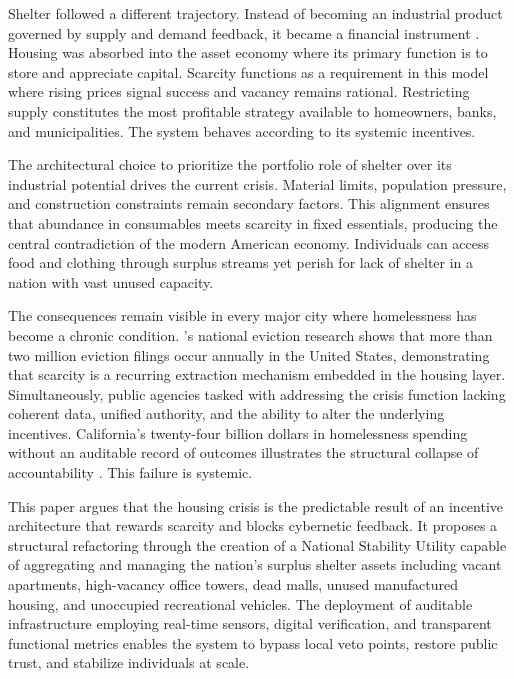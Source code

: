 \documentclass[12pt, letterpaper]{article}
\begin{document}
Shelter followed a different trajectory. Instead of becoming an industrial product governed by supply and demand feedback, it became a financial instrument \citep{aalbers_2016}. Housing was absorbed into the asset economy where its primary function is to store and appreciate capital. Scarcity functions as a requirement in this model where rising prices signal success and vacancy remains rational. Restricting supply constitutes the most profitable strategy available to homeowners, banks, and municipalities. The system behaves according to its systemic incentives.

The architectural choice to prioritize the portfolio role of shelter over its industrial potential drives the current crisis. Material limits, population pressure, and construction constraints remain secondary factors. This alignment ensures that abundance in consumables meets scarcity in fixed essentials, producing the central contradiction of the modern American economy. Individuals can access food and clothing through surplus streams yet perish for lack of shelter in a nation with vast unused capacity.

The consequences remain visible in every major city where homelessness has become a chronic condition. \citet{desmond_2016}'s national eviction research shows that more than two million eviction filings occur annually in the United States, demonstrating that scarcity is a recurring extraction mechanism embedded in the housing layer. Simultaneously, public agencies tasked with addressing the crisis function lacking coherent data, unified authority, and the ability to alter the underlying incentives. California's twenty-four billion dollars in homelessness spending without an auditable record of outcomes illustrates the structural collapse of accountability \citep{ca_state_auditor_2024}. This failure is systemic.

This paper argues that the housing crisis is the predictable result of an incentive architecture that rewards scarcity and blocks cybernetic feedback. It proposes a structural refactoring through the creation of a National Stability Utility capable of aggregating and managing the nation's surplus shelter assets including vacant apartments, high-vacancy office towers, dead malls, unused manufactured housing, and unoccupied recreational vehicles. The deployment of auditable infrastructure employing real-time sensors, digital verification, and transparent functional metrics enables the system to bypass local veto points, restore public trust, and stabilize individuals at scale.
\end{document}
